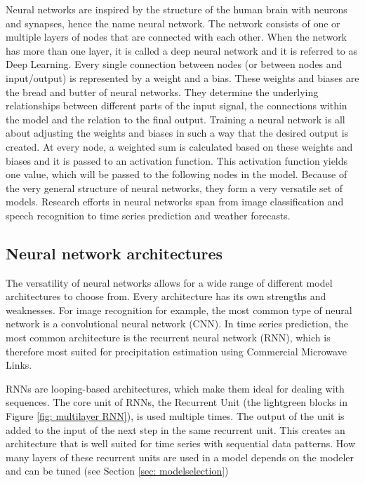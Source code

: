 \documentclass[twocolumn, 10pt, a4paper]{memoir}
\begin{document}
	Neural networks are inspired by the structure of the human brain with neurons and synapses, hence the name neural network. The network consists of one or multiple layers of nodes that are connected with each other. When the network has more than one layer, it is called a deep neural network and it is referred to as Deep Learning. Every single connection between nodes (or between nodes and input/output) is represented by a weight and a bias. These weights and biases are the bread and butter of neural networks. They determine the underlying relationships between different parts of the input signal, the connections within the model and the relation to the final output. Training a neural network is all about adjusting the weights and biases in such a way that the desired output is created. At every node, a weighted sum is calculated based on these weights and biases and it is passed to an activation function. This activation function yields one value, which will be passed to the following nodes in the model.
	Because of the very general structure of neural networks, they form a very versatile set of models. Research efforts in neural networks span from image classification and speech recognition to time series prediction and weather forecasts.
	
	\subsection{Neural network architectures} \label{sec: NN architecture}
	The versatility of neural networks allows for a wide range of different model architectures to choose from. Every architecture has its own strengths and weaknesses. For image recognition for example, the most common type of neural network is a convolutional neural network (CNN). In time series prediction, the most common architecture is the recurrent neural network (RNN), which is therefore most suited for precipitation estimation using Commercial Microwave Links.
	
	RNNs are looping-based architectures, which make them ideal for dealing with sequences. The core unit of RNNs, the Recurrent Unit (the lightgreen blocks in Figure \ref{fig: multilayer RNN}), is used multiple times. The output of the unit is added to the input of the next step in the same recurrent unit. This creates an architecture that is well suited for time series with sequential data patterns. How many layers of these recurrent units are used in a model depends on the modeler and can be tuned (see Section \ref{sec: modelselection})
	
\end{document}
